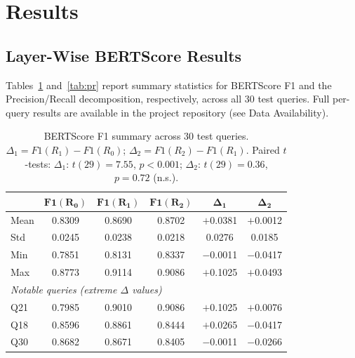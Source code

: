 \documentclass[10pt,journal,compsoc]{IEEEtran}
\begin{document}
\section{Results}
\label{sec:results}

\subsection{Layer-Wise BERTScore Results}
\label{sec:tables}

Tables~\ref{tab:f1} and~\ref{tab:pr} report summary statistics for
BERTScore F1 and the Precision/Recall decomposition, respectively, across
all 30 test queries. Full per-query results are available in the project
repository (see Data Availability).

\begin{table}[t]
  \caption{BERTScore F1 summary across 30 test queries.
  $\Delta_1 = F1(R_1) - F1(R_0)$; $\Delta_2 = F1(R_2) - F1(R_1)$.
  Paired $t$-tests: $\Delta_1$: $t(29)=7.55$, $p<0.001$;
  $\Delta_2$: $t(29)=0.36$, $p=0.72$ (n.s.).}
  \label{tab:f1}
  \centering
  \begin{tabular}{lccccc}
    \toprule
    & $\mathbf{F1(R_0)}$
    & $\mathbf{F1(R_1)}$
    & $\mathbf{F1(R_2)}$
    & $\boldsymbol{\Delta_1}$
    & $\boldsymbol{\Delta_2}$ \\
    \midrule
    Mean   & 0.8309 & 0.8690 & 0.8702 & $+$0.0381 & $+$0.0012 \\
    Std    & 0.0245 & 0.0238 & 0.0218 & 0.0276  & 0.0185  \\
    Min    & 0.7851 & 0.8131 & 0.8337 & $-$0.0011 & $-$0.0417 \\
    Max    & 0.8773 & 0.9114 & 0.9086 & $+$0.1025 & $+$0.0493 \\
    \midrule
    \multicolumn{6}{l}{\emph{Notable queries (extreme $\Delta$ values)}} \\
    Q21    & 0.7985 & 0.9010 & 0.9086 & $+$0.1025 & $+$0.0076 \\
    Q18    & 0.8596 & 0.8861 & 0.8444 & $+$0.0265 & $-$0.0417 \\
    Q30    & 0.8682 & 0.8671 & 0.8405 & $-$0.0011 & $-$0.0266 \\
    \bottomrule
  \end{tabular}
\end{table}
\end{document}
